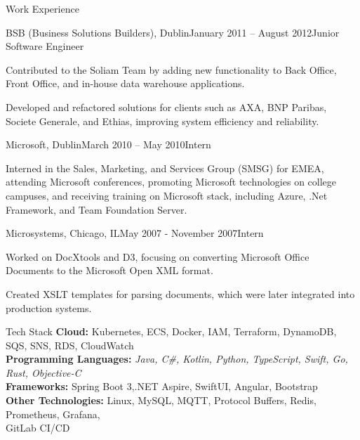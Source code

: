 \documentclass{résumé}
\begin{document}
\begin{rSection}{Work Experience}
\begin{rSubsection}{BSB (Business Solutions Builders), Dublin}{January 2011 – August 2012}{Junior Software Engineer}{}
    \item Contributed to the Soliam Team by adding new functionality to Back Office, Front Office, and in-house data warehouse applications.
    \item Developed and refactored solutions for clients such as AXA, BNP Paribas, Societe Generale, and Ethias, improving system efficiency and reliability.
\end{rSubsection}
\newpage
\begin{rSubsection}{Microsoft, Dublin}{March 2010 – May 2010}{Intern}{}
    \item Interned in the Sales, Marketing, and Services Group (SMSG) for EMEA, attending Microsoft conferences, promoting Microsoft technologies on college campuses, and receiving training on Microsoft stack, including Azure, .Net Framework, and Team Foundation Server.
\end{rSubsection}

\begin{rSubsection}{Microsystems, Chicago, IL}{May 2007 - November 2007}{Intern}{}
    \item Worked on DocXtools and D3, focusing on converting Microsoft Office Documents to the Microsoft Open XML format.
    \item Created XSLT templates for parsing documents, which were later integrated into production systems.
\end{rSubsection}

\end{rSection}

\begin{rSection}{Tech Stack}
\textbf{Cloud:} Kubernetes, ECS, Docker, IAM, Terraform, DynamoDB, SQS, SNS, RDS, CloudWatch \
\\\textbf{Programming Languages:} \textit{Java, C#, Kotlin, Python, TypeScript, Swift, Go, Rust, Objective-C} \
\\\textbf{Frameworks:} Spring Boot 3,.NET Aspire, SwiftUI, Angular, Bootstrap \
\\\textbf{Other Technologies:} Linux, MySQL, MQTT, Protocol Buffers, Redis, Prometheus, Grafana,
\\ GitLab CI/CD
\end{rSection}
\end{document}
